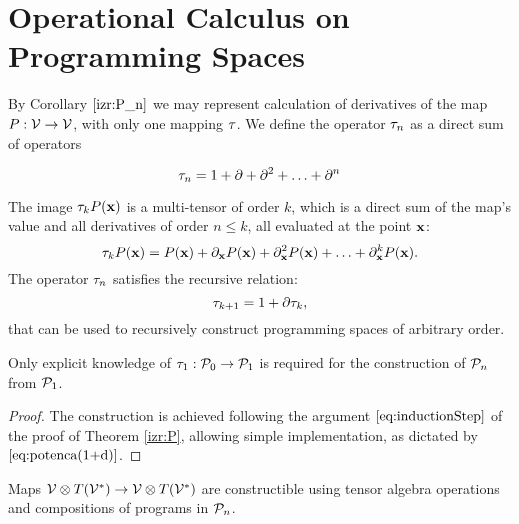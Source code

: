 \section{Operational Calculus on Programming Spaces}\label{sec:operational}


By Corollary $\ref{izr:P_n}$ we may represent calculation of derivatives of the
map $P:\mathcal{V}\to \mathcal{V}$, with only one mapping $\tau$. We define the operator
$\tau_n$ as a direct sum of operators
 
 \begin{equation}\label{eq:DD}
    \tau_n = 1+\partial +\partial^2 +\ldots + \partial^n 
  \end{equation}
  
The image $\tau_kP(\mathbf{x})$ is a multi-tensor of order $k$, which is a direct sum of the map's value and all derivatives of order $n\le k$, all evaluated at the point $\mathbf{x}$:
\begin{equation}
  \label{eq:multi_odvod}
  \tau_kP(\mathbf{x}) = P(\mathbf{x})+\partial_\mathbf{x} P(\mathbf{x}) + \partial^2_\mathbf{x} P(\mathbf{x}) + \ldots + \partial^k_\mathbf{x} P(\mathbf{x}).
\end{equation}
The operator $\tau_n$ satisfies the recursive relation:
  \begin{equation}
    \label{eq:potenca(1+d)}
    \tau_{k+1}=1+\partial\tau_{k},
  \end{equation}
that can be used to recursively construct programming spaces of arbitrary order. 
\begin{proposition}
Only explicit knowledge of $\tau_1:\mathcal{P}_0\to\mathcal{P}_1$ is required for the
construction of $\mathcal{P}_n$ from $\mathcal{P}_1$. 
\end{proposition}
\begin{proof}
  The construction is achieved following the argument $\eqref{eq:inductionStep}$ of the proof of Theorem \ref{izr:P}, allowing simple implementation, as dictated by $\eqref{eq:potenca(1+d)}$. 
\end{proof}
        
\begin{remark}\label{rem:vTen}
Maps $\mathcal{V}\otimes T(\mathcal{V}^*)\to \mathcal{V}\otimes T(\mathcal{V}^*)$ are constructible using
tensor algebra operations and compositions of programs in $\mathcal{P}_n$.
\end{remark}
       
